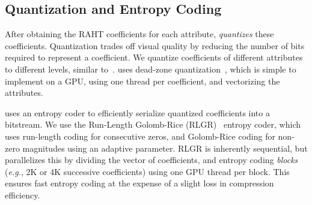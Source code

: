 






\subsection{Quantization and Entropy Coding}\label{sec:quant-entr-coding}

After obtaining the RAHT coefficients for each attribute, \gsnfs{} \textit{quantizes} these coefficients.
%
Quantization trades off visual quality by reducing the number of bits required to represent a coefficient.
%
We quantize coefficients of different \gs{} attributes to different levels, similar to~\cite{mesongs,gpcc-adaptive}.
%
\gsnfs{} uses dead-zone quantization~\cite{deadzone}, which is simple to implement on a GPU, using one thread per coefficient, and vectorizing the attributes.

\gsnfs{} uses an entropy coder to efficiently serialize quantized coefficients into a bitstream.
%
We use the Run-Length Golomb-Rice (RLGR)~\cite{rlgr} entropy coder, which uses run-length coding for consecutive zeros, and Golomb-Rice coding for non-zero magnitudes using an adaptive parameter.
%
RLGR is inherently sequential, but \gsnfs{} parallelizes this by dividing the vector of coefficients, and entropy coding \textit{blocks} (\textit{e.g.}, 2K or 4K successive coefficients) using one GPU thread per block.
%
This ensures fast entropy coding at the expense of a slight loss in compression efficiency.

